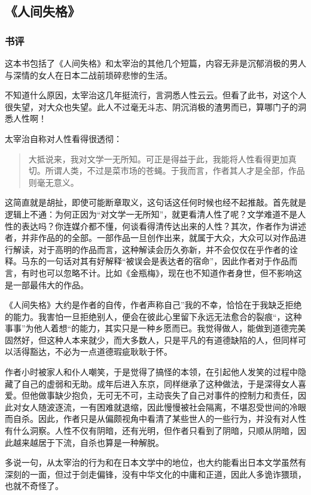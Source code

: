 \subsection{《人间失格》}
\subsubsection{书评}

这本书包括了《人间失格》和太宰治的其他几个短篇，内容无非是沉郁消极的男人与深情的女人在日本二战前琐碎悲惨的生活。

不知道什么原因，太宰治这几年挺流行，言洞悉人性云云。但看了此书，对这个人很失望，对大众也失望。此人不过毫无斗志、阴沉消极的渣男而已，算哪门子的洞悉人性啊！

太宰治自称对人性看得很透彻：
\begin{quotation}
大抵说来，我对文学一无所知。可正是得益于此，我能将人性看得更加真切。所谓人类，不过是菜市场的苍蝇。于我而言，作者其人才是全部，作品则毫无意义。
\end{quotation}

这简直就是胡扯，即使可能断章取义，这句话这任何时候也经不起推敲。首先就是逻辑上不通：为何正因为“对文学一无所知”，就更看清人性了呢？文学难道不是人性的表达吗？你连媒介都不懂，何谈看得清传达出来的人性？其次，作者作为讲述者，并非作品的的全部。一部作品一旦创作出来，就属于大众，大众可以对作品进行解读，对于高明的作品而言，这种解读会历久弥新，并不会仅仅在乎作者的诠释。马东的一句话对其有好解释“被误会是表达者的宿命”，因此作者对于作品而言，有时也可以忽略不计。比如《金瓶梅》，现在也不知道作者身世，但不影响这是一部最伟大的作品。

《人间失格》大约是作者的自传，作者声称自己”我的不幸，恰恰在于我缺乏拒绝的能力。我害怕一旦拒绝别人，便会在彼此心里留下永远无法愈合的裂痕“，这种事事”为他人着想“的能力，其实只是一种乡愿而已。我觉得做人，能做到道德完美固然好，但这种人本来就少，而大多数人，只是平凡的有道德缺陷的人，但同样可以活得豁达，不必为一点道德瑕疵耿耿于怀。

作者小时被家人和仆人嘲笑，于是觉得了搞怪的本领，在引起他人发笑的过程中隐藏了自己的虚弱和无助。成年后进入东京，同样继承了这种做法，于是深得女人喜爱。但他做事缺少抱负，无可无不可，主动丧失了自己对事件的控制力和责任，因此对女人随波逐流，一有困难就退缩，因此慢慢被社会隔离，不堪忍受世间的冷眼而自杀。因此，作者只是从偏颇视角中看清了某些世人的一些行为，并没有对人性有什么洞察。人性不仅有阴暗，还有光明，但作者只看到了阴暗，只顺从阴暗，因此越来越居于下流，自杀也算是一种解脱。

多说一句，从太宰治的行为和在日本文学中的地位，也大约能看出日本文学虽然有深刻的一面，但过于剑走偏锋，没有中华文化的中庸和正道，因此人多诡诈猥琐，也就不奇怪了。

